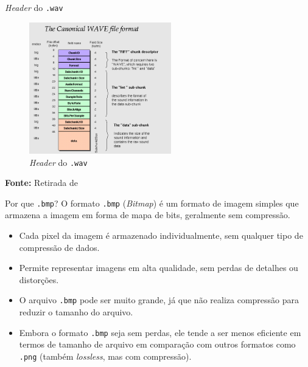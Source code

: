 \documentclass{beamer}
\begin{document}
    \begin{frame}{\textit{Header} do \texttt{.wav}}
        \begin{figure}
            \centering
            \caption{\textit{Header} do \texttt{.wav}} %
            \includegraphics[width=0.55\textwidth]{imagens/wav_header.png}
        \end{figure}
        \vspace{2mm} %
        \centering
        \textbf{Fonte:} Retirada de \textcolor{blue}{\cite{sappwavheader}}%
    \end{frame}

    \begin{frame}{Por que \texttt{.bmp}?}
        O formato \texttt{.bmp} (\textit{Bitmap}) é um formato de imagem simples que armazena a imagem em forma de mapa de bits, geralmente sem compressão. 

        \begin{itemize}
            \item Cada pixel da imagem é armazenado individualmente, sem qualquer tipo de compressão de dados.
            \item Permite representar imagens em alta qualidade, sem perdas de detalhes ou distorções.
            \item O arquivo \texttt{.bmp} pode ser muito grande, já que não realiza compressão para reduzir o tamanho do arquivo.
            \item Embora o formato \texttt{.bmp} seja sem perdas, ele tende a ser menos eficiente em termos de tamanho de arquivo em comparação com outros formatos como \texttt{.png} (também \textit{lossless}, mas com compressão).
        \end{itemize}
    \end{frame}
\end{document}
